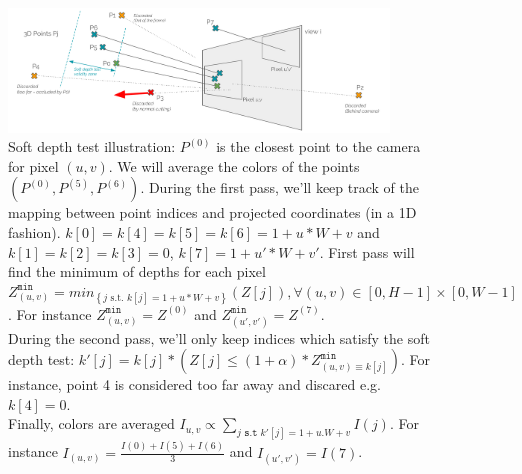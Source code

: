 \begin{figure}[h]
    \centering
    \includegraphics[width=0.9\textwidth]{figures/soft_depth_test_two_pixels.png}
    \caption{Soft depth test illustration: 
    $P^{(0)}$ is the closest point to the camera for pixel $(u,v)$. We will average the colors of the points $(P^{(0)}, P^{(5)}, P^{(6)})$. During the first pass, we'll keep track of the mapping between point indices and projected coordinates (in a 1D fashion). $k[0]=k[4]=k[5]=k[6]=1+u*W+v$ and $k[1]=k[2]=k[3]=0$, $k[7] = 1+u'*W+v'$. First pass will find the minimum of depths for each pixel $Z^{\texttt{min}}_{(u,v)} = min_{\left\{j  \text{ s.t. } k[j]=1+u*W+v\right\}} \left(Z[j]\right), \forall (u,v) \in \left[0, H-1\right] \times \left[0, W-1\right]$. For instance $Z^{\texttt{min}}_{(u,v)} = Z^{(0)}$ and $Z^{\texttt{min}}_{(u',v')} = Z^{(7)}$. \\ During the second pass, we'll only keep indices which satisfy the soft depth test: $ k'[j] = k[j] * \left(Z[j] \leq (1+\alpha) *Z^{\texttt{min}}_{(u,v) \equiv k[j]}\right)$.
   For instance, point 4 is considered too far away and discared e.g. $k[4]=0$. \\Finally, colors are averaged $I_{u, v} \propto \sum_{j \texttt{ s.t  } k'[j]=1+u.W+v}{I(j)}$. For instance $I_{(u, v)} = \frac{I(0) + I(5) + I(6)}{3}$ and $I_{(u', v')} = I(7)$.}
    \label{fig:soft_depth_test}
\end{figure}
